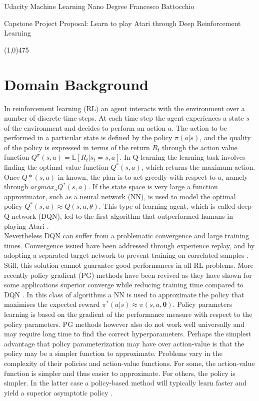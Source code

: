 \documentclass[a4paper, 11pt]{article}
\newcommand{\hl}{\begin{center} \line(1,0){475} \end{center}} %
\newcommand{\ctitle}[1]{\begin{center} \LARGE{#1} \end{center}} %
\begin{document}
\noindent
Udacity Machine Learning Nano Degree \hfill Francesco Battocchio \\


\ctitle{Capstone Project Proposal: Learn to play Atari through Deep Reinforcement Learning}


\hl
\section*{Domain Background}
In reinforcement learning (RL) an agent interacts with the environment over a number of discrete time steps. At each time step the agent experiences a state $s$ of the environment and decides to perform an action $a$. The action to be performed in a particular state is defined by the policy $\pi(a|s)$, and the quality of the policy is expressed in terms of the return $R_t$ through the action value function $Q^{\pi}(s,a) = \mathbb{E}[R_t|s_t=s, a]$. In Q-learning the learning task involves finding the optimal value function $Q^*(s,a)$, which returns the maximum action. Once $Q*(s,a)$ in known, the plan is to act greedly with respect to $a$, namely through $argmax_a Q^*(s,a)$.  If the state space is very large a function approximator, such as a neural network (NN), is used to model the optimal policy $Q^*(s,a) \approx Q(s,a,\theta)$. This type of learning agent, which is called deep Q-network (DQN), led to the first algorithm that outperformed humans in playing Atari \cite{Mnih2013}.\\
Nevertheless DQN can suffer from a problematic convergence and large training times. Convergence issued have been addressed through experience replay, and by adopting a separated target network to prevent training on correlated samples \cite{Mnih2015}. Still, this solution cannot guarantee good performances in all RL problems. More recently policy gradient (PG) methods have been revived as they have shown for some applications superior converge while reducing training time compared to DQN \cite{Mnih2016}. In this class of algorithms a NN is used to approximate the policy that maximises the expected reward $\pi^*(a|s) \approx \pi(s,a,\mathbf{\theta})$. Policy parameters learning is based on the gradient of the performance measure with respect to the policy parameters. PG methods however also do not work well universally and may require long time to find the correct hyperparameters. Perhaps the simplest advantage that policy parameterization may have over action-value is that the policy may be a simpler function to approximate. Problems vary in the complexity of their policies and action-value functions. For some, the action-value function is simpler and thus easier to approximate. For others, the policy is simpler. In the latter case a policy-based method will typically learn faster and yield a superior asymptotic policy \cite{Sutton}.  
\end{document}
